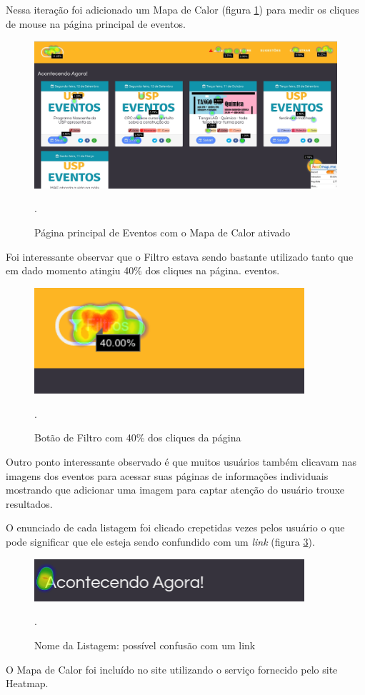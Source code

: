 \par Nessa iteração foi adicionado um Mapa de Calor (figura \ref{fig:heatmap}) para medir os cliques de mouse na página principal de eventos.
\begin{figure}[htb]
\includegraphics[width=15cm]{figuras/heatmap}
\caption{\label{fig:heatmap}  Página principal de Eventos com o Mapa de Calor ativado}.
\end{figure}

\par Foi interessante observar que o Filtro estava sendo bastante utilizado tanto que em dado momento atingiu 40\% dos cliques na página.
eventos.
\begin{figure}[htb]
\includegraphics[width=10cm]{figuras/heatmap_filter}
\caption{\label{fig:heatmap_filter}  Botão de Filtro com 40\% dos cliques da página}.
\end{figure}

\par Outro ponto interessante observado é que muitos usuários também clicavam nas imagens dos eventos para acessar suas páginas de informações individuais mostrando que adicionar uma imagem para captar atenção do usuário trouxe resultados.

\par O enunciado de cada listagem foi clicado crepetidas vezes pelos usuário o que pode significar que ele esteja sendo confundido com um \emph{link} (figura \ref{fig:heatmap_missclick}).
\begin{figure}[htb]
\includegraphics[width=10cm]{figuras/heatmap_missclick}
\caption{\label{fig:heatmap_missclick}  Nome da Listagem: possível confusão com um link}.
\end{figure}
\par O Mapa de Calor foi incluído no site utilizando o serviço fornecido pelo site Heatmap.


